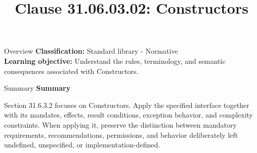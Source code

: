 \documentclass[10pt,letterpaper]{article}
\title{Clause 31.06.03.02: Constructors}
\author{}
\date{}
\begin{document}
\maketitle
\begin{CornellOverviewBox}{Overview}
\textbf{Classification:} Standard library - Normative\\[2pt]
\textbf{Learning objective:} Understand the rules, terminology, and semantic consequences associated with Constructors.
\end{CornellOverviewBox}\begin{CornellSummaryBox}{Summary}
{\sffamily\bfseries\color{Accent} Summary}\par\vspace{3pt}Section 31.6.3.2 focuses on Constructors. Apply the specified interface together with its mandates, effects, result conditions, exception behavior, and complexity constraints. When applying it, preserve the distinction between mandatory requirements, recommendations, permissions, and behavior deliberately left undefined, unspecified, or implementation-defined.
\end{CornellSummaryBox}
\end{document}
